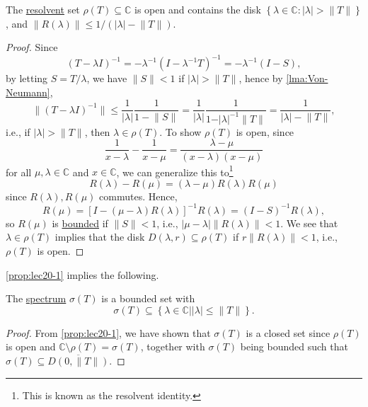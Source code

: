 \begin{proposition}\label{prop:lec20-1}
	The \hyperref[def:regular-point]{resolvent} set \(\rho (T)\subseteq \mathbb{C} \) is open and contains the disk \(\left\{ \lambda \in \mathbb{C} \colon \vert \lambda  \vert > \lVert T \rVert  \right\} \), and \(\lVert R(\lambda ) \rVert \leq 1 / (\vert \lambda  \vert - \lVert T \rVert )\).
\end{proposition}
\begin{proof}
	Since
	\[
		(T-\lambda I)^{-1}
		= - \lambda ^{-1} (I-\lambda ^{-1} T)^{-1}
		= - \lambda ^{-1} (I-S),
	\]
	by letting \(S = T / \lambda \), we have \(\lVert S \rVert < 1\) if \(\vert \lambda \vert > \lVert T \rVert \), hence by \autoref{lma:Von-Neumann},
	\[
		\lVert (T-\lambda I)^{-1} \rVert
		\leq \frac{1}{\vert \lambda  \vert } \frac{1}{1 - \lVert S \rVert }
		= \frac{1}{\vert \lambda  \vert } \frac{1}{1 - \vert \lambda  \vert^{-1} \lVert T \rVert  }
		= \frac{1}{\vert \lambda  \vert - \lVert T \rVert },
	\]
	i.e., if \(\vert \lambda  \vert > \lVert T \rVert \), then \(\lambda \in \rho (T)\). To show \(\rho (T)\) is open, since
	\[
		\frac{1}{x - \lambda } - \frac{1}{x-\mu } = \frac{\lambda -\mu }{(x-\lambda )(x-\mu )}
	\]
	for all \(\mu , \lambda \in \mathbb{C} \) and \(x\in \mathbb{C} \), we can generalize this to\footnote{This is known as the resolvent identity.}
	\[
		R(\lambda ) - R(\mu ) = (\lambda -\mu )R(\lambda )R(\mu )
	\]
	since \(R(\lambda ), R(\mu )\) commutes. Hence,
	\[
		R(\mu )
		= \left[ I-(\mu -\lambda )R(\lambda ) \right] ^{-1} R(\lambda )
		= (I-S)^{-1} R(\lambda ),
	\]
	so \(R(\mu )\) is \hyperref[rmk:bounded-op]{bounded} if \(\lVert S \rVert < 1\), i.e., \(\vert \mu -\lambda  \vert \lVert R(\lambda ) \rVert < 1\). We see that \(\lambda \in \rho (T)\) implies that the disk \(D(\lambda , r) \subseteq \rho (T)\) if \(r \lVert R(\lambda ) \rVert < 1\), i.e., \(\rho (T)\) is open.
\end{proof}

\autoref{prop:lec20-1} implies the following.

\begin{proposition}\label{prop:lec20-2}
	The \hyperref[def:spectrum-point]{spectrum} \(\sigma (T)\) is a bounded set with
	\[
		\sigma (T) \subseteq \left\{ \lambda \in \mathbb{C} \mid \vert \lambda \vert \leq \lVert T \rVert \right\}.
	\]
\end{proposition}
\begin{proof}
	From \autoref{prop:lec20-1}, we have shown that \(\sigma (T)\) is a closed set since \(\rho (T)\) is open and \(\mathbb{C} \setminus \rho (T) = \sigma (T)\), together with \(\sigma (T)\) being bounded such that \(\sigma (T) \subseteq \overline{D(0, \lVert T \rVert )}\).
\end{proof}

